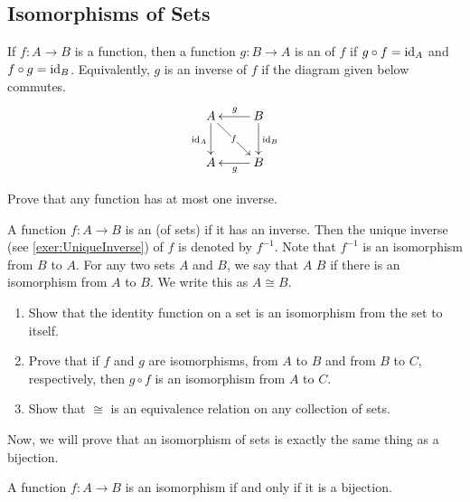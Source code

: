 \subsection{Isomorphisms of Sets}\label{subsec:SetIsos}
If $f \colon A \to B$ is a function, then a function $g \colon B \to A$ is an  of $f$ if $g \circ f = \mathrm{id}_A$ and $f \circ g = \mathrm{id}_B$. Equivalently, $g$ is an inverse of $f$ if the diagram given below commutes.
\begin{equation*}
\xymatrix{
A \ar[d]_{\id_A} \ar[dr]|-f & B \ar[d]^{\id_B} \ar[l]_g\\
A & B \ar[l]^g
}
\end{equation*}

\begin{Exercise}\label{exer:UniqueInverse}
Prove that any function has at most one inverse. \\[0.5em]
\end{Exercise}

A function $f \colon A \to B$ is an  (of sets) if it has an inverse. Then the unique inverse (see \cref{exer:UniqueInverse}) of $f$ is denoted by $f^{-1}$. Note that $f^{-1}$ is an isomorphism from $B$ to $A$. For any two sets $A$ and $B$, we say that $A$  $B$ if there is an isomorphism from $A$ to $B$. We write this as $A \cong B$.

\begin{Exercise}
\mbox{}
\begin{enumerate}
\item Show that the identity function on a set is an isomorphism from the set to itself.
\item Prove that if $f$ and $g$ are isomorphisms, from $A$ to $B$ and from $B$ to $C$, respectively, then $g \circ f$ is an isomorphism from $A$ to $C$.
\item Show that $\cong$ is an equivalence relation on any collection of sets.
\end{enumerate}
\end{Exercise}

Now, we will prove that an isomorphism of sets is exactly the same thing as a bijection.

\begin{Theorem}
A function $f \colon A \to B$ is an isomorphism if and only if it is a bijection.
\end{Theorem}


